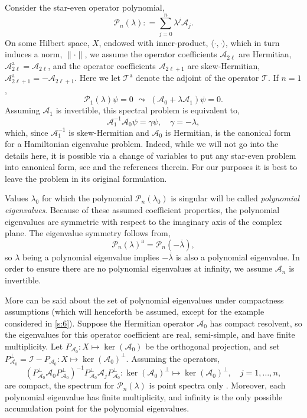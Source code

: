 \documentclass[review,onefignum,onetabnum]{siamart171218}
\def\ker{\mathop\mathrm{ker}\nolimits}
\def\coloneqq{\mathrel{\mathop:}=}
\newcommand{\rma}{\mathrm{a}}
\newcommand{\calA}{\mathcal{A}}
\newcommand{\calI}{\mathcal{I}}
\newcommand{\calP}{\mathcal{P}}
\newcommand{\calT}{\mathcal{T}}
\begin{document}
Consider the star-even operator polynomial,
\[
\calP_n(\lambda)\coloneqq\sum_{j=0}^n\lambda^j\calA_j.
\]
On some Hilbert space, $X$, endowed with inner-product,
$\langle\cdot,\cdot\rangle$, which in turn induces a norm, $\|\cdot\|$, we assume the operator coefficients $\calA_{2\ell}$ are
Hermitian, $\calA_{2\ell}^\rma=\calA_{2\ell}$, and the operator coefficients
$\calA_{2\ell+1}$ are skew-Hermitian,
$\calA_{2\ell+1}^\rma=-\calA_{2\ell+1}$. Here we let $\calT^\rma$ denote the adjoint of the operator $\calT$. If $n=1$,
\[
\calP_1(\lambda)\psi=0\,\,\leadsto\,\,
\left(\calA_0+\lambda\calA_1\right)\psi=0.
\]
Assuming $\calA_1$ is invertible, this spectral problem is equivalent to,
\[
\calA_1^{-1}\calA_0\psi=\gamma\psi,\quad\gamma=-\lambda,
\]
which, since $\calA_1^{-1}$ is skew-Hermitian and $\calA_0$ is Hermitian, is the canonical form for a Hamiltonian eigenvalue problem. Indeed, while we will not go into the details here, it is possible via a change of variables to put any star-even problem into canonical form, see \cite[Section~3]{kapitula:iif13} and the references therein. For our purposes it is best to leave the problem in its original formulation.

Values $\lambda_0$ for which the polynomial
$\calP_n(\lambda_0)$ is singular will be called \textit{polynomial
eigenvalues}. Because of these assumed coefficient properties, the polynomial
eigenvalues are symmetric with respect to the imaginary axis of the complex
plane. The eigenvalue symmetry follows from,
\[
\calP_n(\lambda)^\rma=\calP_n(-\overline{\lambda}),
\]
so $\lambda$ being a polynomial eigenvalue implies $-\overline{\lambda}$ is also a polynomial eigenvalue.
In order to ensure there are no polynomial eigenvalues at infinity, we assume
$\calA_n$ is invertible.

More can be said about the set of polynomial eigenvalues under compactness
assumptions (which will henceforth be assumed, except for the example considered in \cref{s:6}). Suppose the Hermitian
operator $\calA_0$ has compact resolvent, so the eigenvalues for this
operator coefficient are real, semi-simple, and have finite multiplicity. Let
$P_{\calA_0}:X\mapsto\ker(\calA_0)$ be the orthogonal projection, and set
$P_{\calA_0}^\perp=\calI-P_{\calA_0}:X\mapsto\ker(\calA_0)^\perp$. Assuming
the operators,
\[
\left(P_{\calA_0}^\perp\calA_0P_{\calA_0}^\perp\right)^{-1}
P_{\calA_0}^\perp\calA_jP_{\calA_0}^\perp:\ker(\calA_0)^\perp\mapsto\ker(\calA_0)^\perp,\quad
j=1,\dots,n,
\]
are compact, the spectrum for $\calP_n(\lambda)$ is point spectra only
\cite[Remark~2.2]{bronski:aii14}. Moreover, each polynomial eigenvalue has
finite multiplicity, and infinity is the only possible accumulation point for
the polynomial eigenvalues.
\end{document}
